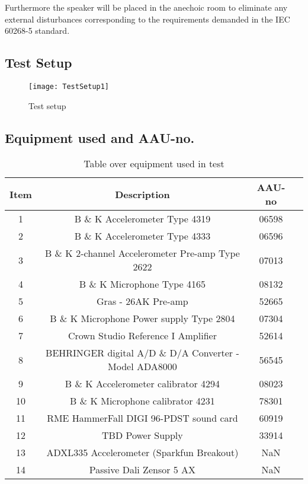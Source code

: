 Furthermore the speaker will be placed in the anechoic room to eliminate any external disturbances corresponding to the requirements demanded in the 
IEC 60268-5 standard.

\subsection*{Test Setup}

\begin{figure}[H]
\centering
%
\texttt{[image: TestSetup1]}
\caption{Test setup}
\label{figure:SpeakertestSetup2}
\end{figure}

\subsection*{Equipment used and AAU-no.}

\begin{table}[H]
\centering
{}
\begin{tabular}{S[table-format=1]ccc} \toprule
    {Item} & {Description} & {AAU-no} \\       &  B \& K Accelerometer Type 4319  & 06598   \\ 
    2      &  B \& K Accelerometer Type 4333  & 06596   \\ 
    3      &  B \& K 2-channel Accelerometer Pre-amp Type 2622  & 07013   \\
    4      &  B \& K Microphone Type 4165  & 08132   \\
    5      &  Gras - 26AK Pre-amp & 52665   \\
    6      &  B \& K Microphone Power supply Type 2804  & 07304   \\
    7      &  Crown Studio Reference I Amplifier & 52614   \\
    8      &  BEHRINGER digital A/D \& D/A Converter - Model ADA8000   & 56545   \\
    9      &  B \& K Accelerometer calibrator 4294 & 08023   \\
    10     &  B \& K Microphone calibrator 4231 & 78301   \\
    11     &  RME HammerFall DIGI 96-PDST sound card & 60919  \\
    12     &  TBD Power Supply & 33914  \\
    13     &  ADXL335 Accelerometer (Sparkfun Breakout) & NaN  \\
    14     &  Passive Dali Zensor 5 AX & NaN  \\ \bottomrule 
\end{tabular}
\caption{Table over equipment used in test}
\label{tab:UsedEquipment2}
\end{table}



